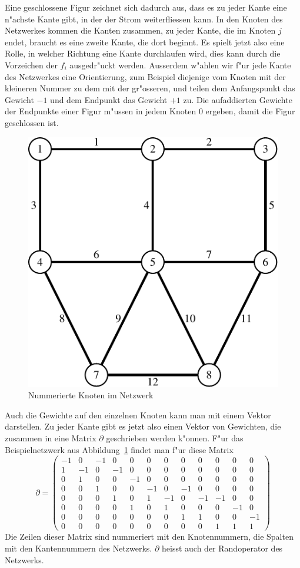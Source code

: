 Eine geschlossene Figur zeichnet sich dadurch aus, dass es zu
jeder Kante eine n"achste Kante gibt, in der der Strom weiterfliessen
kann. In den Knoten des Netzwerkes kommen die Kanten zusammen,
zu jeder Kante, die im Knoten $j$ endet, braucht es eine zweite
Kante, die dort beginnt.
Es spielt jetzt also eine Rolle, in welcher Richtung eine
Kante durchlaufen wird, dies kann durch die Vorzeichen der $f_i$
ausgedr"uckt werden. Ausserdem w"ahlen wir f"ur jede Kante
des Netzwerkes eine Orientierung, zum Beispiel diejenige vom
Knoten mit der kleineren Nummer zu dem mit der gr"osseren,
und teilen dem Anfangspunkt
das Gewicht $-1$ und dem Endpunkt das Gewicht $+1$ zu. Die
aufaddierten Gewichte der Endpunkte einer Figur m"ussen in jedem
Knoten $0$ ergeben, damit die Figur geschlossen ist.
\begin{figure}
\begin{center}
\includegraphics[width=0.6\hsize]{images/kirchhoff-2}
\end{center}
\caption{Nummerierte Knoten im Netzwerk\label{netzwerk-numeriert}}
\end{figure}
Auch die Gewichte auf den einzelnen Knoten kann man mit einem
Vektor darstellen. Zu jeder Kante gibt es jetzt also einen
Vektor von Gewichten, die zusammen in eine Matrix $\partial$
geschrieben werden k"onnen.
F"ur das Beispielnetzwerk aus Abbildung~\ref{netzwerk-numeriert}
findet man f"ur diese Matrix
\setcounter{MaxMatrixCols}{12}
\[
\partial=\begin{pmatrix}
-1& 0&-1& 0& 0& 0& 0& 0& 0& 0& 0& 0\\
 1&-1& 0&-1& 0& 0& 0& 0& 0& 0& 0& 0\\
 0& 1& 0& 0&-1& 0& 0& 0& 0& 0& 0& 0\\
 0& 0& 1& 0& 0&-1& 0&-1& 0& 0& 0& 0\\
 0& 0& 0& 1& 0& 1&-1& 0&-1&-1& 0& 0\\
 0& 0& 0& 0& 1& 0& 1& 0& 0& 0&-1& 0\\
 0& 0& 0& 0& 0& 0& 0& 1& 1& 0& 0&-1\\
 0& 0& 0& 0& 0& 0& 0& 0& 0& 1& 1& 1
\end{pmatrix}
\]
Die Zeilen dieser Matrix sind nummeriert mit den Knotennummern,
die Spalten mit den Kantennummern des Netzwerks. $\partial$
heisst auch der Randoperator des Netzwerks.

